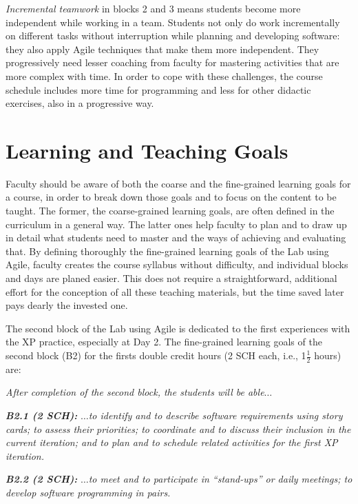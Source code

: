 \documentclass[conference]{IEEEtran}
\begin{document}
\textit{Incremental teamwork} in blocks 2 and 3 means students become more independent while working in a team. Students not only do work incrementally on different tasks without interruption while planning and developing software: they also apply Agile techniques that make them more independent. They progressively need lesser coaching from faculty for mastering activities that are more complex with time. In order to cope with these challenges, the course schedule includes more time for programming and less for other didactic exercises, also in a progressive way.


\section{Learning and Teaching Goals}
\label{sec:coursegoals}

Faculty should be aware of both the coarse and the fine-grained learning goals for a course, in order to break down those goals and to focus on the content to be taught. The former, the coarse-grained learning goals, are often defined in the curriculum in a general way. The latter ones help faculty to plan and to draw up in detail what students need to master and the ways of achieving and evaluating that. By defining thoroughly the fine-grained learning goals of the Lab using Agile, faculty creates the course syllabus without difficulty, and individual blocks and days are planed easier. This does not require a straightforward, additional effort for the conception of all these teaching materials, but the time saved later pays dearly the invested one.

The second block of the Lab using Agile is dedicated to the first experiences with the XP practice, especially at Day 2. The fine-grained learning goals of the second block (B2) for the firsts double credit hours (2 SCH each, i.e., 1$\frac{1}{2}$ hours) are: 

\textit{After completion of the second block, the students will be able$\dots$ }

\textit{\bfseries B2.1 (2 SCH):} $\dots$\textit{to identify and to describe software requirements using story cards; to assess their priorities; to coordinate and to discuss their inclusion in the current iteration; and to plan and to schedule related activities for the first XP iteration.}

\textit{\bfseries B2.2 (2 SCH):} $\dots$\textit{to meet and to participate in ``stand-ups'' or daily meetings; to develop software programming in pairs.}
\end{document}
